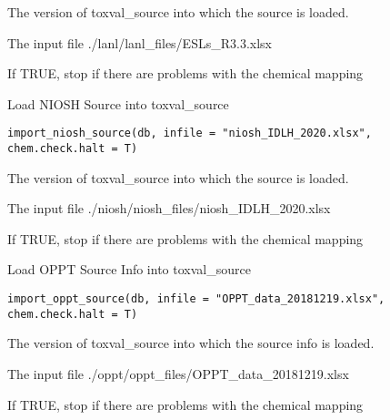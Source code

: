 \documentclass[letterpaper]{book}
\begin{document}
%
\begin{Arguments}
\begin{ldescription}
\item[\code{db}] The version of toxval\_source into which the source is loaded.

\item[\code{infile}] The input file ./lanl/lanl\_files/ESLs\_R3.3.xlsx

\item[\code{chem.check.halt}] If TRUE, stop if there are problems with the chemical mapping
\end{ldescription}
\end{Arguments}
%
\begin{Description}\relax
Load NIOSH Source into toxval\_source
\end{Description}
%
\begin{Usage}
\begin{verbatim}
import_niosh_source(db, infile = "niosh_IDLH_2020.xlsx", chem.check.halt = T)
\end{verbatim}
\end{Usage}
%
\begin{Arguments}
\begin{ldescription}
\item[\code{db}] The version of toxval\_source into which the source is loaded.

\item[\code{infile}] The input file ./niosh/niosh\_files/niosh\_IDLH\_2020.xlsx

\item[\code{chem.check.halt}] If TRUE, stop if there are problems with the chemical mapping
\end{ldescription}
\end{Arguments}
%
\begin{Description}\relax
Load OPPT Source Info into toxval\_source
\end{Description}
%
\begin{Usage}
\begin{verbatim}
import_oppt_source(db, infile = "OPPT_data_20181219.xlsx", chem.check.halt = T)
\end{verbatim}
\end{Usage}
%
\begin{Arguments}
\begin{ldescription}
\item[\code{db}] The version of toxval\_source into which the source info is loaded.

\item[\code{infile}] The input file ./oppt/oppt\_files/OPPT\_data\_20181219.xlsx

\item[\code{chem.check.halt}] If TRUE, stop if there are problems with the chemical mapping
\end{ldescription}
\end{Arguments}
\end{document}
